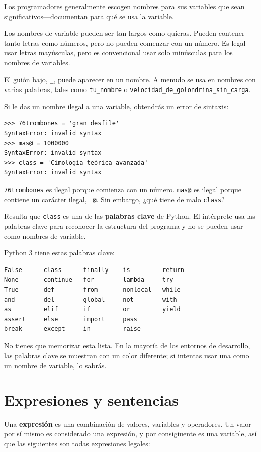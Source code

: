 \documentclass[10pt]{book}
\begin{document}
Los programadores generalmente escogen nombres para sus variables que
sean significativos---documentan para qué se usa la variable.

Los nombres de variable pueden ser tan largos como quieras.  Pueden contener
tanto letras como números, pero no pueden comenzar con un número.
Es legal usar letras mayúsculas, pero es convencional
usar solo minúsculas para los nombres de variables.

El guión bajo, \verb"_", puede aparecer en un nombre.
A menudo se usa en nombres con varias palabras, tales como
\verb"tu_nombre" o \verb"velocidad_de_golondrina_sin_carga".

Si le das un nombre ilegal a una variable, obtendrás un error de sintaxis:

\begin{verbatim}
>>> 76trombones = 'gran desfile'
SyntaxError: invalid syntax
>>> mas@ = 1000000
SyntaxError: invalid syntax
>>> class = 'Cimología teórica avanzada'
SyntaxError: invalid syntax
\end{verbatim}
%
{\tt 76trombones} es ilegal porque comienza con un número.
{\tt mas@} es ilegal porque contiene un carácter ilegal, {\tt
@}.  Sin embargo, ¿qué tiene de malo {\tt class}?

Resulta que {\tt class} es una de las {\bf palabras clave} de Python.  El
intérprete usa las palabras clave para reconocer la estructura del programa
y no se pueden usar como nombres de variable.

Python 3 tiene estas palabras clave:

\begin{verbatim}
False      class      finally    is         return
None       continue   for        lambda     try
True       def        from       nonlocal   while
and        del        global     not        with
as         elif       if         or         yield
assert     else       import     pass
break      except     in         raise
\end{verbatim}
%
No tienes que memorizar esta lista.  En la mayoría de los entornos de desarrollo,
las palabras clave se muestran con un color diferente; si intentas usar una
como un nombre de variable, lo sabrás.


\section{Expresiones y sentencias}

Una {\bf expresión} es una combinación de valores, variables y operadores.
Un valor por sí mismo es considerado una expresión, y por consigiuente es
una variable, así que las siguientes son todas expresiones legales:
\end{document}
